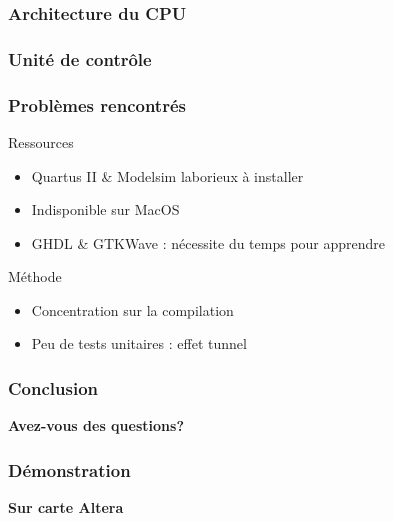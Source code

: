 \documentclass{beamer}
\begin{document}
\begin{frame}
\frametitle{Architecture du CPU}
\end{frame}

\begin{frame}
\frametitle{Unité de contrôle}
\end{frame}

\begin{frame}
\frametitle{Problèmes rencontrés}
\begin{block}{Ressources}
	\begin{itemize}
		\item Quartus II & Modelsim laborieux à installer
		\item Indisponible sur MacOS
		\item GHDL & GTKWave : nécessite du temps pour apprendre
	\end{itemize}
\end{block}
\begin{block}{Méthode}
	\begin{itemize}
		\item Concentration sur la compilation
		\item Peu de tests unitaires : effet tunnel
	\end{itemize}
\end{block}
\end{frame}

\begin{frame}
\frametitle{Conclusion}
\end{frame}

\begin{frame}
\begin{center}
	{\Large \textbf{Avez-vous des questions?}}
\end{center}
\end{frame}

\begin{frame}
\frametitle{Démonstration}
\begin{center}
	{\Large \textbf{Sur carte Altera}}
\end{center}
\end{frame}

\end{document}
